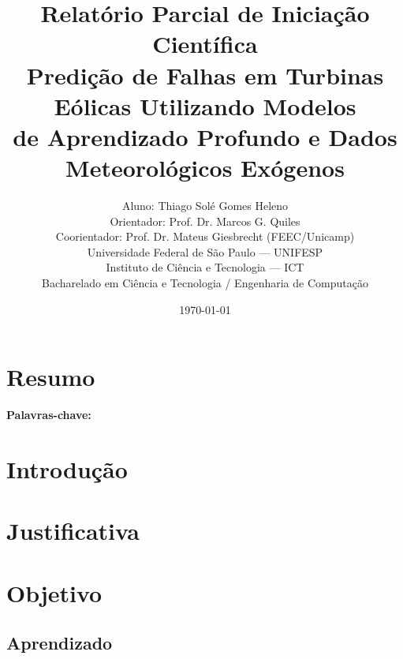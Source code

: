 \documentclass[12pt,a4paper]{article}
\title{\textbf{Relatório Parcial de Iniciação Científica\\[0.3cm]
Predição de Falhas em Turbinas Eólicas Utilizando Modelos\\
de Aprendizado Profundo e Dados Meteorológicos Exógenos}}
\author{
  Aluno: Thiago Solé Gomes Heleno \\
  Orientador: Prof. Dr. Marcos G. Quiles \\
  Coorientador: Prof. Dr. Mateus Giesbrecht (FEEC/Unicamp) \\[0.3cm]
  Universidade Federal de São Paulo --- UNIFESP \\
  Instituto de Ciência e Tecnologia --- ICT \\
  Bacharelado em Ciência e Tecnologia / Engenharia de Computação
}
\date{\today}
\begin{document}
\maketitle
\thispagestyle{empty}
\newpage

\section*{Resumo}

\vspace{0.5cm}
\noindent\textbf{Palavras-chave:} %

\newpage

\tableofcontents
\newpage
\listoffigures
\newpage
\listoftables
\newpage


\setcounter{page}{1}

\section{Introdução}

\section{Justificativa}

\section{Objetivo}

\subsection{Aprendizado}
\end{document}
